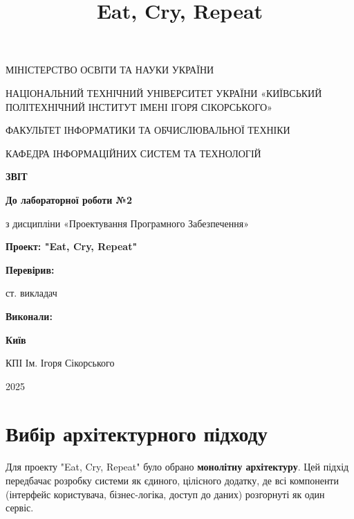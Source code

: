 \documentclass[12pt, a4paper]{article}
\title{Eat, Cry, Repeat}
\author{}
\date{}
\begin{document}
\begin{titlepage}
    \begin{center}
		{\Large
			МІНІСТЕРСТВО ОСВІТИ ТА НАУКИ УКРАЇНИ

			НАЦІОНАЛЬНИЙ ТЕХНІЧНИЙ УНІВЕРСИТЕТ УКРАЇНИ
			«КИЇВСЬКИЙ ПОЛІТЕХНІЧНИЙ ІНСТИТУТ ІМЕНІ ІГОРЯ СІКОРСЬКОГО»

			ФАКУЛЬТЕТ ІНФОРМАТИКИ ТА ОБЧИСЛЮВАЛЬНОЇ ТЕХНІКИ

			КАФЕДРА ІНФОРМАЦІЙНИХ СИСТЕМ ТА ТЕХНОЛОГІЙ
		}


		\vspace{60mm}
		{\large
			\textbf{ЗВІТ}

			\vspace{5mm}

			\textbf{До лабораторної роботи №2}

			\vspace{5mm}

			з дисципліни «Проектування Програмного Забезпечення»
		}

    \vspace{10mm}
    {\huge \textbf{Проект: "Eat, Cry, Repeat"}}

	\end{center}

	\vfill
    	\begin{minipage}[t]{0.30\textwidth}
		\textbf{Перевірив:}

		ст. викладач
	\end{minipage}
	\hfill
    	\begin{minipage}[t]{0.35\textwidth}
		\textbf{Виконали:}
	\end{minipage}

	\vfill

	\begin{center}
		{\bf
			Київ

			КПІ Ім. Ігоря Сікорського

			2025
		}
	\end{center}
\end{titlepage}

\renewcommand{\contentsname}{Зміст}
\tableofcontents
\newpage

\section{Вибір архітектурного підходу}

Для проекту "Eat, Cry, Repeat" було обрано \textbf{монолітну архітектуру}. Цей
підхід передбачає розробку системи як єдиного, цілісного додатку, де всі
компоненти (інтерфейс користувача, бізнес-логіка, доступ до даних) розгорнуті
як один сервіс.
\end{document}

